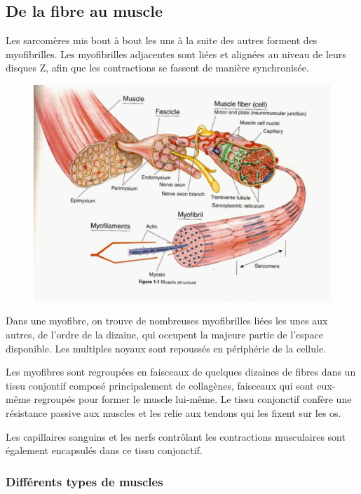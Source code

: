 \subsection{De la fibre au muscle}

Les sarcomères mis bout à bout les uns à la suite des autres forment des myofibrilles. Les myofibrilles adjacentes sont liées et alignées au niveau de leurs disques Z, afin que les contractions se fassent de manière synchronisée. 

\begin{figure}
\includegraphics[scale=0.5]{Figures/12_29_0.png} 
\end{figure}

Dans une myofibre, on trouve de nombreuses myofibrilles liées les unes aux autres, de l'ordre de la dizaine, qui occupent la majeure partie de l'espace disponible. Les multiples noyaux sont repoussés en périphérie de la cellule. 

Les myofibres sont regroupées en faisceaux de quelques dizaines de fibres dans un tissu conjontif composé principalement de collagènes, faisceaux qui sont eux-même regroupés pour former le muscle lui-même. Le tissu conjonctif confère une résistance passive aux muscles et les relie aux tendons qui les fixent sur les os. 

Les capillaires sanguins et les nerfs contrôlant les contractions musculaires sont également encapsulés dans ce tissu conjonctif. 
\subsubsection{Différents types de muscles}

